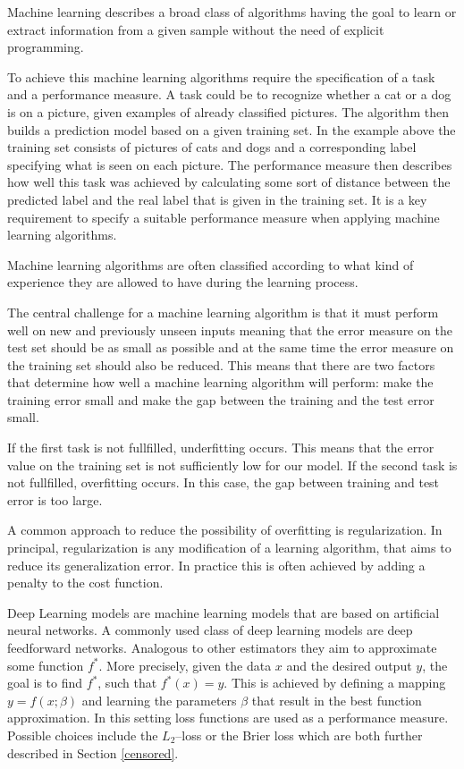 \documentclass[12pt, a4paper]{scrartcl}
\theoremstyle{definition}
\theoremstyle{plain}
\numberwithin{equation}{section}
\numberwithin{figure}{section}
\numberwithin{table}{section}
\begin{document}
	Machine learning describes a broad class of algorithms having the goal to learn or extract information from a given sample without the need of explicit programming.
	
	To achieve this machine learning algorithms require the specification of a task and a performance measure.
	A task could be to recognize whether a cat or a dog is on a picture, given examples of already classified pictures.
	The algorithm then builds a prediction model based on a given training set.
	In the example above the training set consists of pictures of cats and dogs and a corresponding label specifying what is seen on each picture.
	The performance measure then describes how well this task was achieved by calculating some sort of distance between the predicted label and the real label that is given in the training set.
	It is a key requirement to specify a suitable performance measure when applying machine learning algorithms.
	
	Machine learning algorithms are often classified according to what kind of experience they are allowed to have during the learning process.

	The central challenge for a machine learning algorithm is that it must perform well on new and previously unseen inputs meaning that the error measure on the test set should be as small as possible and at the same time the error measure on the training set should also be reduced.
	This means that there are two factors that determine how well a machine learning algorithm will perform:
	make the training error small and make the gap between the training and the test error small.
	
	If the first task is not fullfilled, underfitting occurs. This means that the error value on the training set is not sufficiently low for our model.
	If the second task is not fullfilled, overfitting occurs. In this case, the gap between training and test error is too large.
	
	A common approach to reduce the possibility of overfitting is regularization.
	In principal, regularization is any modification of a learning algorithm, that aims to reduce its generalization error.
	In practice this is often achieved by adding a penalty to the cost function.
	
	Deep Learning models are machine learning models that are based on artificial neural networks.
	A commonly used class of deep learning models are deep feedforward networks. Analogous to other estimators they aim to approximate some function $f^*$.
	More precisely, given the data $x$ and the desired output $y$, the goal is to find $f^*$, such that $f^*(x)=y$.
	This is achieved by defining a mapping $y = f(x; \beta)$ and learning the parameters $\beta$ that result in the best function approximation.
	In this setting loss functions are used as a performance measure.
	Possible choices include the $L_2$--loss or the Brier loss which are both further described in Section \ref{censored}.
	
\end{document}
